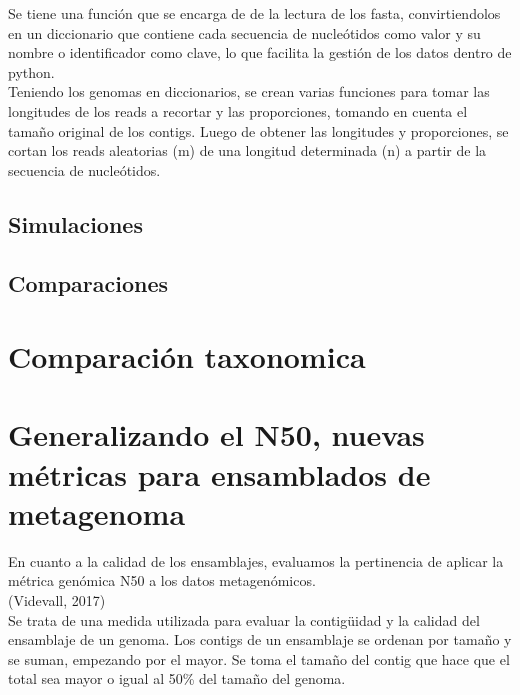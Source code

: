 Se tiene una función que se encarga de de la lectura de los fasta, convirtiendolos en un diccionario que contiene cada secuencia de nucleótidos como valor y su nombre o identificador como clave, lo que facilita la gestión de los datos dentro de python.   \\

Teniendo los genomas en diccionarios, se crean varias funciones para tomar las longitudes de los reads a recortar y las proporciones,  tomando en cuenta el tamaño original de los contigs. Luego de obtener las longitudes y proporciones, se cortan los reads aleatorias (m) de una longitud determinada (n) a partir de la secuencia de nucleótidos.  \\


\subsection{Simulaciones}


\subsection{Comparaciones}


\section{Comparación taxonomica}

\section{Generalizando el N50, nuevas métricas para ensamblados de metagenoma}

En cuanto a la calidad de los ensamblajes, evaluamos la pertinencia de aplicar la métrica genómica N50 a los datos metagenómicos.  \\
(Videvall, 2017)  \\

Se trata de una medida utilizada para evaluar la contigüidad y la calidad del ensamblaje de un genoma. Los contigs de un ensamblaje se ordenan por tamaño y se suman, empezando por el mayor. Se toma el tamaño del contig que hace que el total sea mayor o igual al 50\% del tamaño del genoma.  \\



